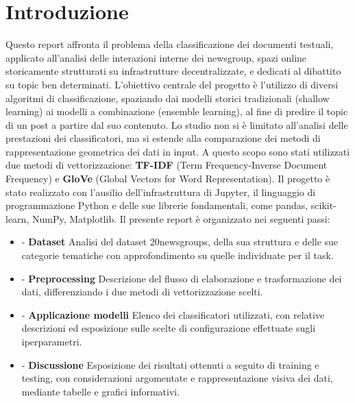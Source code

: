 \documentclass[12pt, a4paper, twoside]{article}
\numberwithin{table}{section}
\begin{document}
    \section{Introduzione}
    Questo report affronta il problema della classificazione dei documenti testuali, applicato all'analisi
    delle interazioni interne dei newsgroup, spazi online storicamente strutturati su infrastrutture decentralizzate, 
    e dedicati al dibattito su topic ben determinati. L'obiettivo centrale del progetto è l'utilizzo di diversi algoritmi
    di classificazione, spaziando dai modelli storici tradizionali (shallow learning) ai modelli a combinazione (ensemble learning),
    al fine di predire il topic di un post a partire dal suo contenuto.
    Lo studio non si è limitato all'analisi delle prestazioni dei classificatori, ma si estende alla comparazione dei metodi di rappresentazione
    geometrica dei dati in input. A questo scopo sono stati utilizzati due metodi di vettorizzazione: 
    \textbf{TF-IDF} (Term Frequency-Inverse Document Frequency) e \textbf{GloVe} (Global Vectors for Word Representation). Il progetto è stato realizzato con l'ausilio dell'infrastruttura di Jupyter, il linguaggio di programmazione Python 
    e delle sue librerie fondamentali, come pandas, scikit-learn, NumPy, Matplotlib. Il presente report è organizzato nei seguenti passi:
    \begin{itemize}
        \item \textbf{} - \textbf{Dataset} Analisi del dataset 20newsgroups, della sua struttura e delle sue categorie tematiche
        con approfondimento su quelle individuate per il task.

        \item \textbf{} - \textbf{Preprocessing} Descrizione del flusso di elaborazione e trasformazione dei dati, differenziando i due metodi di vettorizzazione scelti.
        
        \item \textbf{} - \textbf{Applicazione modelli} Elenco dei classificatori utilizzati, con relative descrizioni ed esposizione sulle scelte di configurazione effettuate sugli iperparametri.
        
        \item \textbf{} - \textbf{Discussione} Esposizione dei risultati ottenuti a seguito di training e testing, con considerazioni argomentate e rappresentazione visiva dei dati, mediante tabelle e grafici informativi.

    \end{itemize}
\end{document}
